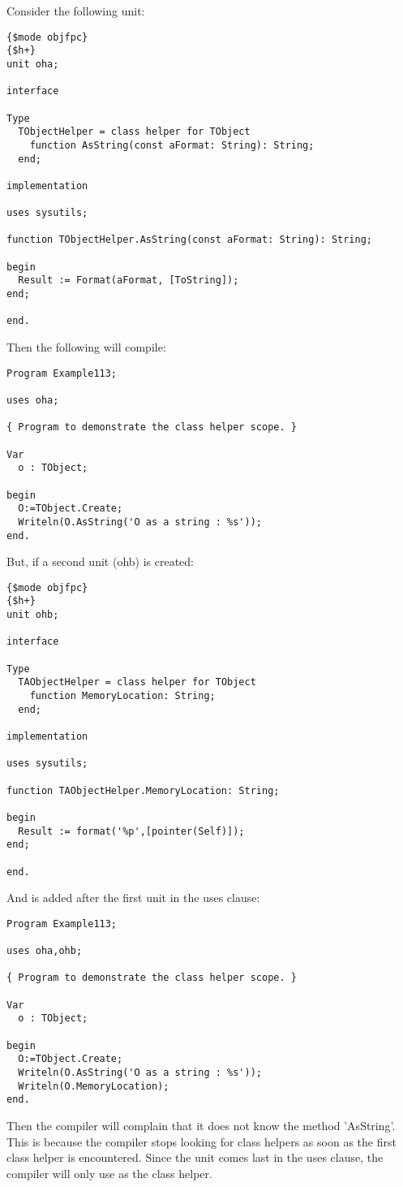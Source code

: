 Consider the following unit:
\begin{verbatim}
{$mode objfpc}
{$h+}
unit oha;

interface

Type
  TObjectHelper = class helper for TObject
    function AsString(const aFormat: String): String;
  end;
  
implementation

uses sysutils;
   
function TObjectHelper.AsString(const aFormat: String): String;

begin
  Result := Format(aFormat, [ToString]);
end;

end.     
\end{verbatim}
Then the following will compile:
\begin{verbatim}
Program Example113;

uses oha;

{ Program to demonstrate the class helper scope. }

Var
  o : TObject;

begin
  O:=TObject.Create;
  Writeln(O.AsString('O as a string : %s'));
end.
\end{verbatim}
But, if a second unit (ohb) is created:
\begin{verbatim}
{$mode objfpc}
{$h+}
unit ohb;

interface

Type
  TAObjectHelper = class helper for TObject
    function MemoryLocation: String;
  end;
  
implementation

uses sysutils;
   
function TAObjectHelper.MemoryLocation: String;

begin
  Result := format('%p',[pointer(Self)]);
end;

end.     
\end{verbatim}
And is added after the first unit in the uses clause:
\begin{verbatim}
Program Example113;

uses oha,ohb;

{ Program to demonstrate the class helper scope. }

Var
  o : TObject;

begin
  O:=TObject.Create;
  Writeln(O.AsString('O as a string : %s'));
  Writeln(O.MemoryLocation);
end.
\end{verbatim}
Then the compiler will complain that it does not know the method 'AsString'.
This is because the compiler stops looking for class helpers as soon as the
first class helper is encountered. Since the  unit comes last in
the uses clause, the compiler will only use  as the class
helper.

